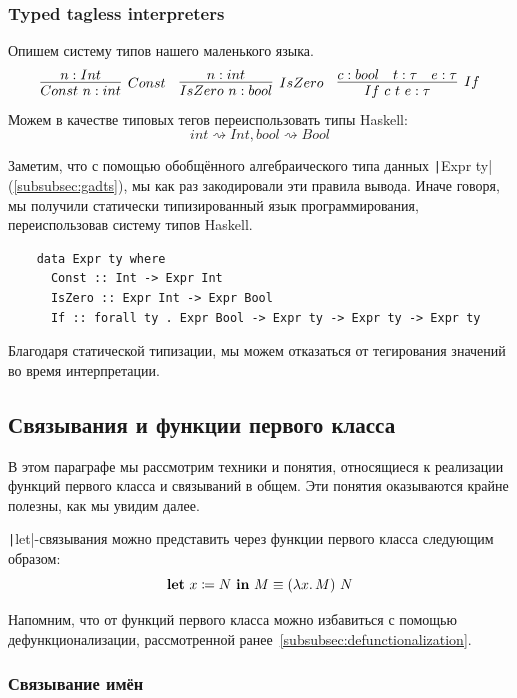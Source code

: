 \subsubsection{Typed tagless interpreters} \label{subsubsec:typed-tagless-initial}

Опишем систему типов нашего маленького языка.
\begin{equation*}{}
    \infer[Const]{Const~n : int}{n : Int}
    \quad
    \infer[IsZero]{IsZero~n : bool}{n : int}
    \quad
    \infer[If]{If~c~t~e : \tau}{c : bool & t : \tau & e : \tau}
\end{equation*}
Можем в качестве типовых тегов переиспользовать типы Haskell: \[int \rightsquigarrow Int, bool \rightsquigarrow Bool\]

Заметим, что с помощью обобщённого алгебраического типа данных \texttt|Expr ty| (\ref{subsubsec:gadts}), мы как раз закодировали эти правила вывода.
Иначе говоря, мы получили статически типизированный язык программирования, переиспользовав систему типов Haskell.
\begin{verbatim}
    data Expr ty where
      Const :: Int -> Expr Int
      IsZero :: Expr Int -> Expr Bool
      If :: forall ty . Expr Bool -> Expr ty -> Expr ty -> Expr ty
\end{verbatim}

Благодаря статической типизации, мы можем отказаться от тегирования значений во время интерпретации.

\subsection{Связывания и функции первого класса} \label{subsec:first-class-functions}

В этом параграфе мы рассмотрим техники и понятия, относящиеся к реализации функций первого класса и связываний в общем.
Эти понятия оказываются крайне полезны, как мы увидим далее.

\texttt|let|-связывания можно представить через функции первого класса следующим образом:
\[
    \mathbf{let} ~ x \coloneqq N ~ \mathbf{in} ~ M \equiv (\lambda x\ldotp M) ~ N
\]

Напомним, что от функций первого класса можно избавиться с помощью дефункционализации, рассмотренной ранее~\ref{subsubsec:defunctionalization}.

\subsubsection{Связывание имён} \label{subsubsec:name-bindings}

